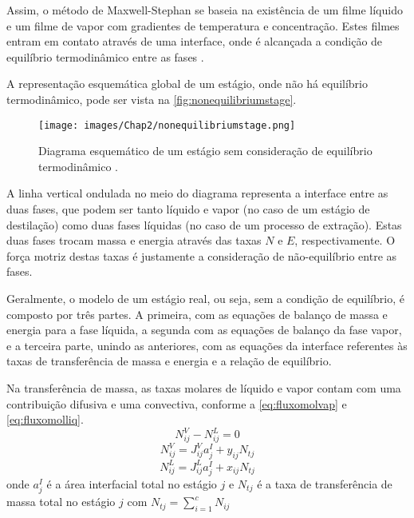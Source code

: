Assim, o método de Maxwell-Stephan se baseia na existência de um filme líquido e um filme de vapor com gradientes de
temperatura e concentração. Estes filmes entram em contato através de uma interface, onde é alcançada a condição de
equilíbrio termodinâmico entre as fases \cite{Koeijer:2004}.

A representação esquemática global de um estágio, onde não há equilíbrio termodinâmico, pode ser vista na
\autoref{fig:nonequilibriumstage}.
 \begin{figure}[htb]
 \centering \texttt{[image: images/Chap2/nonequilibriumstage.png]}
 \caption{Diagrama esquemático de um estágio sem consideração de equilíbrio termodinâmico \cite{Kooijman:1995a}.}
 \label{fig:nonequilibriumstage}
 \end{figure}
A linha vertical ondulada no meio do diagrama representa a interface entre as duas fases, que podem ser tanto líquido e
vapor (no caso de um estágio de destilação) como duas fases líquidas (no caso de
um processo de extração). Estas duas fases trocam massa e energia através das
taxas $N$ e $E$, respectivamente. O força motriz destas taxas é justamente a
consideração de não-equilíbrio entre as fases.

Geralmente, o modelo de um estágio real, ou seja, sem a condição de equilíbrio, é composto por três partes. A primeira,
com as equações de balanço de massa e energia para a fase líquida, a segunda com as equações de balanço da fase vapor,
e a terceira parte, unindo as anteriores, com as equações da interface referentes às taxas de transferência de massa
e energia e a relação de equilíbrio.

Na transferência de massa, as taxas molares de líquido e vapor contam com uma contribuição difusiva e uma convectiva,
conforme a \autoref{eq:fluxomolvap} e \ref{eq:fluxomolliq}. %
\begin{equation}
N^V_{ij} - N^L_{ij}= 0
\label{eq:equilfluxomol}
\end{equation}
\begin{equation}
N^V_{ij} = J^V_{ij}a_j^I + y_{ij}N_{tj}
\label{eq:fluxomolvap}
\end{equation}
\begin{equation}
N^L_{ij} = J^L_{ij}a_j^I + x_{ij}N_{tj}
\label{eq:fluxomolliq}
\end{equation}
onde $a^I_j$ é a área interfacial total no estágio $j$ e $N_{tj}$ é a taxa de
transferência de massa total no estágio $j$ com $N_{tj} =
\displaystyle\sum_{i=1}^c N_{ij}$

